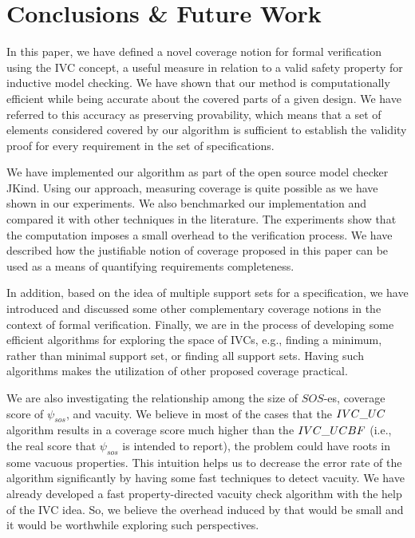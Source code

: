 \section{Conclusions \& Future Work}
\label{sec:conclusion}

In this paper, we have defined a novel coverage notion for formal verification using
the IVC concept, a useful measure in relation to
a valid safety property for inductive model checking. We have shown that our method
 is computationally efficient while
 being accurate about the covered parts of a given design.
 We have referred to this accuracy as preserving provability, which means
 that a set of elements considered covered by our algorithm is sufficient
 to establish the validity proof for every requirement in the set of specifications.

 We have implemented
our algorithm as part of the open source model checker JKind. Using our approach, measuring coverage is quite possible as we have shown in our experiments.
 We also benchmarked our implementation and compared it with other techniques in the literature.
 The experiments show that the computation imposes a small overhead to the verification process. We have described how the justifiable notion of coverage proposed in this paper can be used as a
means of quantifying requirements completeness.

 In addition, based on the idea of multiple support sets for a specification, we
 have introduced and discussed some other complementary coverage notions in the context of formal verification. Finally, we are in the process of developing some efficient algorithms for exploring the space of IVCs, e.g., finding a
minimum, rather than minimal support set, or finding all support sets. Having such algorithms makes the utilization of other proposed coverage practical.

We are also investigating the relationship among the size of $SOS$-es, coverage score of $\psi_{sos}$, and vacuity. We believe in most of the cases that the ${IVC\_UC}$ algorithm results in a coverage score much higher
than the ${IVC\_UCBF}$ (i.e., the real score that $\psi_{sos}$ is intended to report), the problem
could have roots in some vacuous properties. This intuition helps us to decrease the error rate of the \ucalg algorithm significantly by having some fast techniques to detect vacuity. We have already developed a  fast property-directed vacuity check
algorithm with the help of the IVC idea. So, we believe the overhead induced by that would be small and it would be worthwhile exploring such perspectives. 